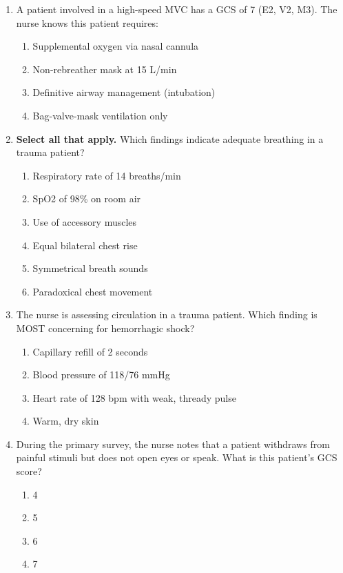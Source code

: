 \documentclass[11pt]{article}
\begin{document}
\begin{enumerate}
\item A patient involved in a high-speed MVC has a GCS of 7 (E2, V2, M3). The nurse knows this patient requires:

\begin{enumerate}[label=\Alph*.]
    \item Supplemental oxygen via nasal cannula
    \item Non-rebreather mask at 15 L/min
    \item Definitive airway management (intubation)
    \item Bag-valve-mask ventilation only
\end{enumerate}

\item \textbf{Select all that apply.} Which findings indicate adequate breathing in a trauma patient?

\begin{enumerate}[label=\Alph*.]
    \item Respiratory rate of 14 breaths/min
    \item SpO2 of 98\% on room air
    \item Use of accessory muscles
    \item Equal bilateral chest rise
    \item Symmetrical breath sounds
    \item Paradoxical chest movement
\end{enumerate}

\item The nurse is assessing circulation in a trauma patient. Which finding is MOST concerning for hemorrhagic shock?

\begin{enumerate}[label=\Alph*.]
    \item Capillary refill of 2 seconds
    \item Blood pressure of 118/76 mmHg
    \item Heart rate of 128 bpm with weak, thready pulse
    \item Warm, dry skin
\end{enumerate}

\item During the primary survey, the nurse notes that a patient withdraws from painful stimuli but does not open eyes or speak. What is this patient's GCS score?

\begin{enumerate}[label=\Alph*.]
    \item 4
    \item 5
    \item 6
    \item 7
\end{enumerate}


\end{enumerate}
\end{document}
